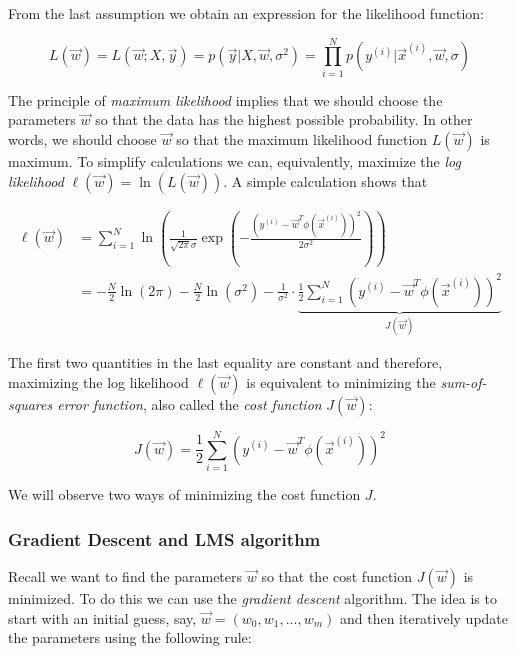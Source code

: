 From the last assumption we obtain an expression for the likelihood function: 

\begin{equation}
	L(\vec{w}) = L(\vec{w}; X,\vec{y}) = p (\vec{y}| X, \vec{w}, \sigma^2) = \prod_{i=1}^{N} p(y^{(i)}| \vec{x}^{(i)},\vec{w},\sigma)
\end{equation}

The principle of \emph{maximum likelihood} implies that we should choose the parameters $\vec{w}$ so that the data has the highest possible probability. In other words, we should choose $\vec{w}$ so that the maximum likelihood function $L(\vec{w})$ is maximum. To simplify calculations we can, equivalently, maximize the \emph{log likelihood} $\ell(\vec{w}) = \ln (L(\vec{w}))$. A simple calculation shows that

\begin{align}
	\ell(\vec{w}) &= \sum_{i=1}^N \ln \left( \frac{1}{\sqrt{2\pi}\sigma} \exp\left(-\frac{(y^{(i)}- \vec{w}^T\phi(\vec{x}^{(i)}))^2}{2\sigma^2}\right)\right) \\ &= -\frac{N}{2}\ln(2\pi) - \frac{N}{2}\ln(\sigma^2) - \frac{1}{\sigma^2}\cdot \underbrace{\frac{1}{2}\sum_{i=1}^{N} (y^{(i)} - \vec{w}^T\phi(\vec{x}^{(i)}) )^2}_{J(\vec{w})}
\end{align}

The first two quantities in the last equality are constant and therefore, maximizing the log likelihood $\ell(\vec{w})$ is equivalent to minimizing the \emph{sum-of-squares error function}, also called the \emph{cost function} $J(\vec{w})$: 

\begin{equation}\label{Eq.Sec.Lin.Reg.4}
	J(\vec{w}) = \frac{1}{2}\sum_{i=1}^{N} (y^{(i)} - \vec{w}^T\phi(\vec{x}^{(i)}) )^2
\end{equation}

We will observe two ways of minimizing the cost function $J$. 

\subsubsection{Gradient Descent and LMS algorithm}

Recall we want to find the parameters $\vec{w}$ so that the cost function $J(\vec{w})$ is minimized. To do this we can use the \emph{gradient descent} algorithm. The idea is to start with an initial guess, say, $\vec{w} = (w_0,w_1,...,w_m)$ and then iteratively update the parameters using the following rule: 

